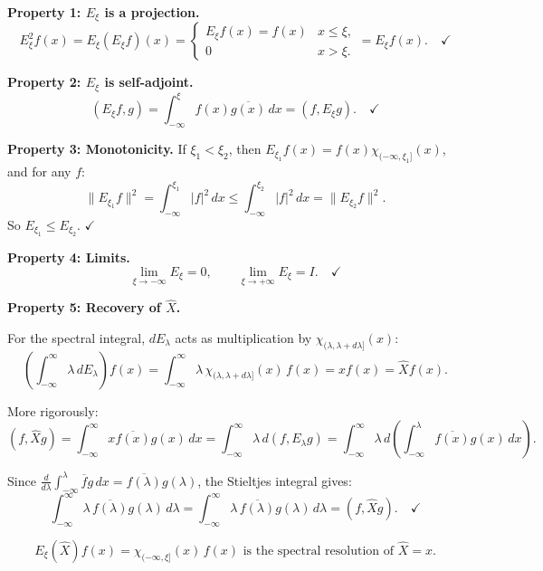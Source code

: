 \documentclass[12pt]{article}
\begin{document}
\textbf{Property 1: $E_\xi$ is a projection.}
\[
E_\xi^2 f(x) = E_\xi(E_\xi f)(x) = \begin{cases} E_\xi f(x) = f(x) & x \leq \xi, \\ 0 & x > \xi. \end{cases} = E_\xi f(x). \quad\checkmark
\]

\textbf{Property 2: $E_\xi$ is self-adjoint.}
\[
(E_\xi f, g) = \int_{-\infty}^{\xi}f(x)\overline{g(x)}\,dx = (f, E_\xi g). \quad\checkmark
\]

\textbf{Property 3: Monotonicity.} If $\xi_1 < \xi_2$, then $E_{\xi_1}f(x) = f(x)\chi_{(-\infty,\xi_1]}(x)$, and for any $f$:
\[
\|E_{\xi_1}f\|^2 = \int_{-\infty}^{\xi_1}|f|^2\,dx \leq \int_{-\infty}^{\xi_2}|f|^2\,dx = \|E_{\xi_2}f\|^2.
\]
So $E_{\xi_1} \leq E_{\xi_2}$. $\checkmark$

\textbf{Property 4: Limits.}
\[
\lim_{\xi\to-\infty}E_\xi = 0, \qquad \lim_{\xi\to+\infty}E_\xi = I. \quad\checkmark
\]

\textbf{Property 5: Recovery of $\hat{X}$.}

For the spectral integral, $dE_\lambda$ acts as multiplication by $\chi_{(\lambda, \lambda+d\lambda]}(x)$:
\[
\left(\int_{-\infty}^{\infty}\lambda\,dE_\lambda\right)f(x) = \int_{-\infty}^{\infty}\lambda\,\chi_{(\lambda,\lambda+d\lambda]}(x)\,f(x) = xf(x) = \hat{X}f(x).
\]

More rigorously:
\[
(f, \hat{X}g) = \int_{-\infty}^{\infty}x\overline{f(x)}g(x)\,dx = \int_{-\infty}^{\infty}\lambda\,d(f, E_\lambda g) = \int_{-\infty}^{\infty}\lambda\,d\left(\int_{-\infty}^{\lambda}\overline{f(x)}g(x)\,dx\right).
\]

Since $\frac{d}{d\lambda}\int_{-\infty}^{\lambda}\overline{f}g\,dx = \overline{f(\lambda)}g(\lambda)$, the Stieltjes integral gives:
\[
\int_{-\infty}^{\infty}\lambda\,\overline{f(\lambda)}g(\lambda)\,d\lambda = \int_{-\infty}^{\infty}\lambda\,\overline{f(\lambda)}g(\lambda)\,d\lambda = (f, \hat{X}g). \quad\checkmark
\]

\[
\boxed{E_\xi(\hat{X})f(x) = \chi_{(-\infty,\xi]}(x)\,f(x) \text{ is the spectral resolution of } \hat{X} = x.}
\]
\end{document}
